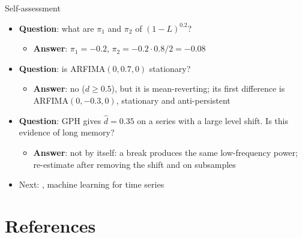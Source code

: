 \begin{frame}{Self-assessment}
\itemsize{\small}
\begin{itemize}
    \item \textbf{Question}: what are $\pi_1$ and $\pi_2$ of $(1-L)^{0.2}$?
    \begin{itemize}
        \item \textbf{Answer}: $\pi_1 = -0.2$, $\pi_2 = -0.2 \cdot 0.8/2 = -0.08$
    \end{itemize}
    \item \textbf{Question}: is ARFIMA$(0, 0.7, 0)$ stationary?
    \begin{itemize}
        \item \textbf{Answer}: no ($d \ge 0.5$), but it is mean-reverting; its first difference is ARFIMA$(0, -0.3, 0)$, stationary and anti-persistent
    \end{itemize}
    \item \textbf{Question}: GPH gives $\hat d = 0.35$ on a series with a large level shift. Is this evidence of long memory?
    \begin{itemize}
        \item \textbf{Answer}: not by itself: a break produces the same low-frequency power; re-estimate after removing the shift and on subsamples
    \end{itemize}
    \item Next: , machine learning for time series
\end{itemize}
\end{frame}


\section{References}

